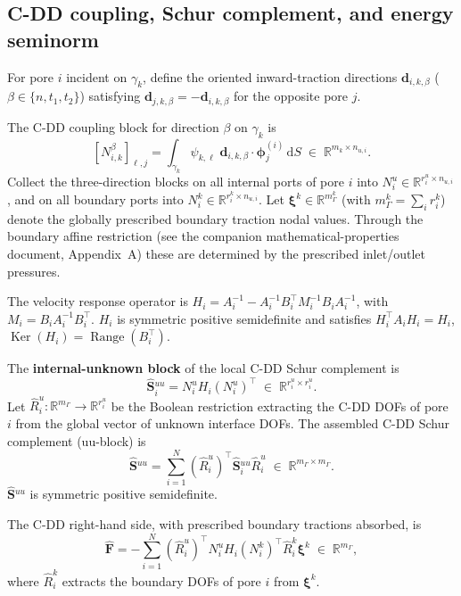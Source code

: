 \documentclass[11pt,a4paper]{article}
\theoremstyle{definition}
\newcommand{\R}{\mathbb{R}}
\newcommand{\iface}{\gamma}
\newcommand{\Schur}{\mathbf{S}}
\newcommand{\Shatuu}{\widehat{\Schur}{}^{uu}}
\newcommand{\Fhat}{\widehat{\bm{F}}}
\newcommand{\Range}{\operatorname{Range}}
\newcommand{\Ker}{\operatorname{Ker}}
\begin{document}
\subsection{C-DD coupling, Schur complement, and energy seminorm}

For pore $i$ incident on $\iface_k$, define the oriented
inward-traction directions
$\bm{d}_{i,k,\beta}$ ($\beta\in\{n,t_1,t_2\}$) satisfying
$\bm{d}_{j,k,\beta} = -\bm{d}_{i,k,\beta}$ for the opposite pore $j$.

The C-DD coupling block for direction $\beta$ on $\iface_k$ is
\begin{equation}\label{eq:N}
  [N_{i,k}^{\beta}]_{\ell,j}
  = \int_{\iface_k} \psi_{k,\ell}\;
    \bm{d}_{i,k,\beta}\cdot\bm{\phi}_j^{(i)}\,\mathrm{d}S
  \;\in\; \R^{m_k\times n_{u,i}}.
\end{equation}
Collect the three-direction blocks on all internal ports of pore $i$
into $N_i^u \in \R^{r_i^u \times n_{u,i}}$, and on all boundary ports
into $N_i^k \in \R^{r_i^k \times n_{u,i}}$.  Let $\bm{\xi}^k \in
\R^{m_\Gamma^k}$ (with $m_\Gamma^k = \sum_i r_i^k$) denote the
globally prescribed boundary traction nodal values.  Through the
boundary affine restriction (see the companion
mathematical-properties document, Appendix~A) these are determined by
the prescribed inlet/outlet pressures.

The velocity response operator is
$H_i = A_i^{-1} - A_i^{-1}B_i^\top M_i^{-1}B_i A_i^{-1}$,
with $M_i = B_i A_i^{-1}B_i^\top$.
$H_i$ is symmetric positive semidefinite and satisfies
$H_i^\top A_i H_i = H_i$,
$\Ker(H_i) = \Range(B_i^\top)$.

The \textbf{internal-unknown block} of the local C-DD Schur complement is
\begin{equation}\label{eq:Shat-local}
  \Shatuu_i = N_i^u H_i (N_i^u)^\top \;\in\; \R^{r_i^u\times r_i^u}.
\end{equation}
Let $\widehat{R}_i^u : \R^{m_\Gamma} \to \R^{r_i^u}$ be the Boolean
restriction extracting the C-DD DOFs of pore $i$ from the global
vector of unknown interface DOFs.  The assembled C-DD Schur complement
(uu-block) is
\begin{equation}\label{eq:Shat}
  \Shatuu = \sum_{i=1}^N (\widehat{R}_i^u)^\top \Shatuu_i \widehat{R}_i^u
  \;\in\; \R^{m_\Gamma\times m_\Gamma}.
\end{equation}
$\Shatuu$ is symmetric positive semidefinite.

The C-DD right-hand side, with prescribed boundary tractions absorbed,
is
\begin{equation}\label{eq:Fhat}
  \Fhat = -\sum_{i=1}^N (\widehat{R}_i^u)^\top
    N_i^u H_i (N_i^k)^\top \widehat{R}_i^k \bm{\xi}^k
  \;\in\; \R^{m_\Gamma},
\end{equation}
where $\widehat{R}_i^k$ extracts the boundary DOFs of pore $i$ from
$\bm{\xi}^k$.
\end{document}
